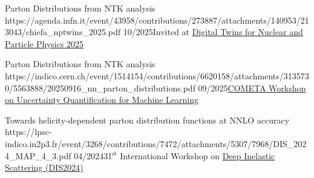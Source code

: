 
  {Parton Distributions from NTK analysis}
  {https://agenda.infn.it/event/43958/contributions/273887/attachments/140953/213043/chiefa_nptwins_2025.pdf}
  {10/2025}{Invited at \href{https://agenda.infn.it/event/43958}{Digital Twins for Nuclear and Particle Physics 2025}}

  {Parton Distributions from NTK analysis}
  {https://indico.cern.ch/event/1514154/contributions/6620158/attachments/3135730/5563888/20250916_nn_parton_distributions.pdf}
  {09/2025}{\href{https://indico.cern.ch/event/1514154/}{COMETA Workshop on Uncertainty Quantification for Machine Learning}}

  {Towards helicity-dependent parton distribution functions at NNLO accuracy}
  {https://lpsc-indico.in2p3.fr/event/3268/contributions/7472/attachments/5307/7968/DIS_2024_MAP_4_3.pdf}
  {04/2024}{31$^{\textrm{st}}$ International Workshop on \href{https://lpsc-indico.in2p3.fr/event/3268/}{Deep Inelastic Scattering (DIS2024)}}
